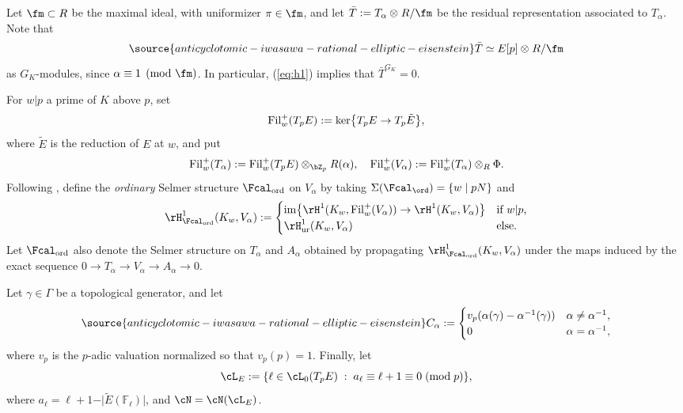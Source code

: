 Let $\fm\subset R$ be the maximal ideal,
with uniformizer $\pi\in\fm$,
and let $\bar{T}:=T_\alpha\otimes_{} R/\fm$ be the residual representation associated to $T_\alpha$. Note that
\begin{equation}\label{eq:modp}
\source{anticyclotomic-iwasawa-rational-elliptic-eisenstein}
\bar{T}\simeq E[p]\otimes_{}R/\fm
\end{equation}
as $G_K$-modules, since $\alpha\equiv 1\pmod{\fm}$. In particular, (\ref{eq:h1}) implies that $\bar{T}^{G_K}=0$.

For $w\vert p$ a prime of $K$ above $p$,  set
\[
{\rm Fil}_w^+(T_pE):={\rm ker}\bigl\{T_pE\rightarrow T_p\tilde{E}\bigr\},
\]
where $\tilde{E}$ is the reduction of $E$ at $w$, and put
\[
{\rm Fil}_w^+(T_\alpha):={\rm Fil}_w^+(T_pE)\otimes_{\bZ_p}R(\alpha),\quad{\rm Fil}_w^+(V_\alpha):={\rm Fil}_w^+(T_\alpha)\otimes_{R}\Phi.
\]
Following \cite{coates-greenberg},  define the \emph{ordinary} Selmer structure $\Fcal_{\rm ord}$ on $V_\alpha$ by
taking $\Sigma(\Fcal_{\rm \ord}) = \{w\mid pN\}$ and
\[
\rH^1_{\Fcal_{\rm ord}}(K_w,V_\alpha):=
\begin{cases}
{\rm im}\bigl\{\rH^1(K_w,{\rm Fil}_w^+(V_\alpha))\rightarrow\rH^1(K_w,V_\alpha)\bigr\} & \textrm{if $w\vert p$,}\\
\rH^1_{\rm ur}(K_w,V_\alpha)& \textrm{else.}
\end{cases}
\]
Let $\Fcal_{\rm ord}$ also denote the Selmer structure on $T_\alpha$ and $A_\alpha$ obtained by propagating $\rH^1_{\Fcal_{\rm ord}}(K_w,V_\alpha)$ under the maps induced by the exact sequence
$0\rightarrow T_\alpha\rightarrow V_\alpha\rightarrow A_\alpha\rightarrow 0$.

Let $\gamma\in\Gamma$ be a topological generator, and let
\begin{equation}\label{eq:erralpha}
\source{anticyclotomic-iwasawa-rational-elliptic-eisenstein}
C_\alpha:=
\begin{cases}
v_p(\alpha(\gamma)-\alpha^{-1}(\gamma)) & \alpha\neq \alpha^{-1}, \\
0 & \alpha = \alpha^{-1},
\end{cases}
\end{equation}
where $v_p$ is the $p$-adic valuation normalized so that $v_p(p)=1$. Finally, let
\[
\cL_E:=\{\ell\in\cL_0(T_pE)\;:\;a_\ell\equiv\ell+1\equiv 0\;({\rm mod}\;p)\},
\]
where $a_\ell=\ell+1-\vert\tilde{E}(\mathbb{F}_\ell)\vert$, and $\cN=\cN(\cL_E)$.

